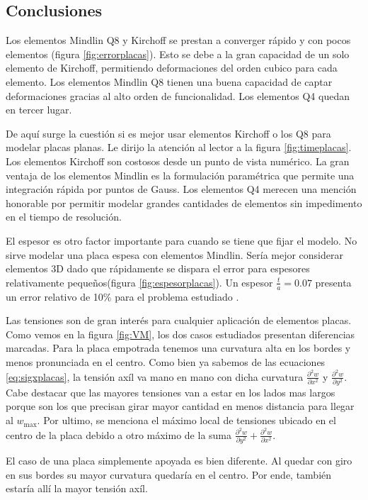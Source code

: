 \documentclass[onecolumn,10pt,titlepage]{article}
\begin{document}
\subsection{Conclusiones}
Los elementos Mindlin Q8 y Kirchoff se prestan a converger rápido y con pocos elementos (figura \ref{fig:errorplacas}). Esto se debe a la gran capacidad de un solo elemento de Kirchoff, permitiendo deformaciones del orden cubico para cada elemento. Los elementos Mindlin Q8 tienen una buena capacidad de captar deformaciones gracias al alto orden de funcionalidad. Los elementos Q4 quedan en tercer lugar. 

De aquí surge la cuestión si es mejor usar elementos Kirchoff o los Q8 para modelar placas planas. Le dirijo la atención al lector a la figura \ref{fig:timeplacas}. Los elementos Kirchoff son costosos desde un punto de vista numérico. La gran ventaja de los elementos Mindlin es la formulación paramétrica que permite una integración rápida por puntos de Gauss. Los elementos Q4 merecen una mención honorable por permitir modelar grandes cantidades de elementos sin impedimento en el tiempo de resolución. 

El espesor es otro factor importante para cuando se tiene que fijar el modelo. No sirve modelar una placa espesa con elementos Mindlin. Sería mejor considerar elementos 3D dado que rápidamente se dispara el error para espesores relativamente pequeños(figura \ref{fig:espesorplacas}). Un espesor $\frac{t}{a}=0.07$ presenta un error relativo de 10\% para el problema estudiado .

Las tensiones son de gran interés para cualquier aplicación de elementos placas. Como vemos en la figura \ref{fig:VM}, los dos casos estudiados presentan diferencias marcadas.  Para la placa empotrada tenemos una curvatura alta en los bordes y menos pronunciada en el centro. Como bien ya sabemos de las ecuaciones \eqref{eq:sigxplacas}, la tensión axíl va mano en mano con dicha curvatura $\frac{\partial^2 w}{\partial x^2}$ y $\frac{\partial^2 w}{\partial y^2}$. Cabe destacar que las mayores tensiones van a estar en los lados mas largos porque son los que precisan girar mayor cantidad en menos distancia para llegar al $w_{\max}$. Por ultimo, se menciona el máximo local de tensiones ubicado en el centro de la placa debido a otro máximo de la suma $\frac{\partial^2 w}{\partial y^2}+\frac{\partial^2 w}{\partial x^2}$.

El caso de una placa simplemente apoyada es bien diferente. Al quedar con giro en sus bordes su mayor curvatura quedaría en el centro. Por ende, también estaría allí la mayor tensión axíl.
\end{document}
